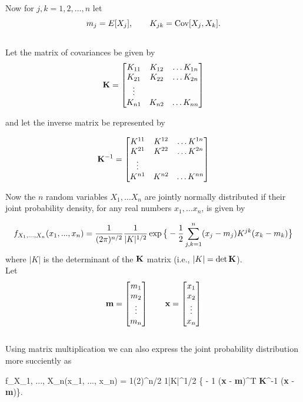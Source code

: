 Now for $j,k = 1, 2, \hdots, n$ let $$m_j = E[X_j], \quad\quad K_{jk} = \hbox{Cov}[X_j, X_k].$$ \\
Let  the matrix of covariances be given by
$${\bf K} = 
\begin{bmatrix}
K_{11} & K_{12} & \hdots K_{1n} \\
K_{21} & K_{22} & \hdots K_{2n} \\
\vdots  \\
K_{n1} & K_{n2} & \hdots K_{nn} \\
\end{bmatrix}$$

and let the inverse matrix be represented by 

$${\bf K}^{-1} = 
\begin{bmatrix}
K^{11} & K^{12} & \hdots K^{1n} \\
K^{21} & K^{22} & \hdots K^{2n} \\
\vdots  \\
K^{n1} & K^{n2} & \hdots K^{nn} \\
\end{bmatrix}$$

Now the $n$ random variables $X_1, \hdots X_n$ are jointly normally distributed if their joint probability density, for any real numbers $x_1, \hdots x_n$, is given by

$$f_{X_1, ..., X_n}(x_1, ..., x_n)  = {1\over(2\pi)^{n/2}} {1\over|K|^{1/2}} \exp\big\{ - {1\over2}\sum_{j,k = 1}^n (x_j - m_j) K^{jk} (x_k-m_k)\big\}$$where $|K|$ is the determinant of the ${\bf K}$ matrix (i.e., $|K| = \det {\bf K}$).\\

Let 
$${\bf m} =
\begin{bmatrix}
           m_{1} \\
           m_{2} \\
           \vdots \\
           m_{n}
\end{bmatrix}
\quad \quad {\bf x} = 
\begin{bmatrix}
           x_{1} \\
           x_{2} \\
           \vdots \\
           x_{n}
\end{bmatrix}
$$ \\

Using matrix multiplication we can also express the joint probability distribution more succiently as 

\be f_{X_1, ..., X_n}(x_1, ..., x_n)  = {1\over(2\pi)^{n/2}} {1\over|K|^{1/2}} \exp\big\{ - {1} ({\bf x} - {\bf m})^T {\bf K}^{-1} ({\bf x} -{\bf m})\big\}. \label{eqn:GaussianDistribution}\ee

